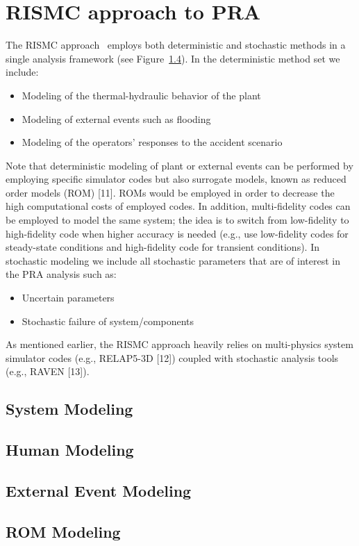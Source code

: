 \section{RISMC approach to PRA}
\label{sec:rismc}
The RISMC approach~\cite{} employs both deterministic and stochastic methods 
in a single analysis framework (see Figure~\ref{}). In the deterministic method 
set we include:
\begin{itemize}
  \item Modeling of the thermal-hydraulic behavior of the plant~\cite{}
  \item Modeling of external events such as flooding~\cite{}
  \item Modeling of the operators’ responses to the accident scenario~\cite{}
\end{itemize}

Note that deterministic modeling of plant or external events can be performed by employing 
specific simulator codes but also surrogate models, known as reduced order models (ROM) [11]. 
ROMs would be employed in order to decrease the high computational costs of employed codes.
In addition, multi-fidelity codes can be employed to model the same system; the idea is to 
switch from low-fidelity to high-fidelity code when higher accuracy is needed (e.g., use 
low-fidelity codes for steady-state conditions and high-fidelity code for transient conditions).
In stochastic modeling we include all stochastic parameters that are of interest in the PRA 
analysis such as:
\begin{itemize}
  \item Uncertain parameters
  \item Stochastic failure of system/components
\end{itemize}
As mentioned earlier, the RISMC approach heavily relies on multi-physics system simulator 
codes (e.g., RELAP5-3D [12]) coupled with stochastic analysis tools (e.g., RAVEN [13]). 

\subsection{System Modeling}

\subsection{Human Modeling}

\subsection{External Event Modeling}

\subsection{ROM Modeling}